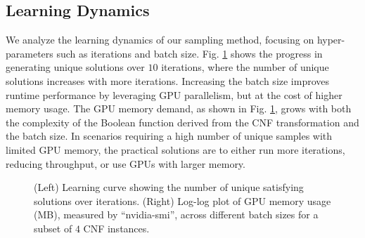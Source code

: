 \subsection{Learning Dynamics}
We analyze the learning dynamics of our sampling method, focusing on hyper-parameters such as iterations and batch size. Fig. \ref{fig3} shows the progress in generating unique solutions over $10$ iterations, where the number of unique solutions increases with more iterations. Increasing the batch size improves runtime performance by leveraging GPU parallelism, but at the cost of higher memory usage. The GPU memory demand, as shown in Fig. \ref{fig3}, grows with both the complexity of the Boolean function derived from the CNF transformation and the batch size. In scenarios requiring a high number of unique samples with limited GPU memory, the practical solutions are to either run more iterations, reducing throughput, or use GPUs with larger memory.



\begin{figure}
    \centering
    \scalebox{0.9}{
    }
    \caption{(Left) Learning curve showing the number of unique satisfying solutions over iterations. (Right) Log-log plot of GPU memory usage (MB), measured by ``nvidia-smi'', across different batch sizes for a subset of $4$ CNF instances.}
    \label{fig3}
    \vspace{-0.4cm}
\end{figure}


%     

